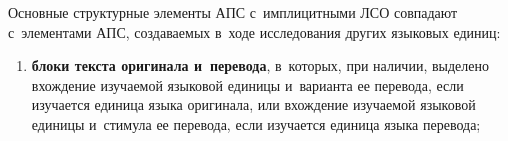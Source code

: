 \begin{multicols}{2}
Основные структурные элементы АПС с~имплицитными ЛСО совпадают с~элементами АПС, создаваемых в~ходе исследования других языковых 
единиц:
\begin{enumerate}[(1)]
\item \textbf{блоки текста оригинала и~перевода}, в~которых, при наличии, выделено вхождение 
изучаемой языковой единицы и~варианта ее перевода, если изучается единица языка оригинала, 
или вхождение изучаемой языковой единицы и~стимула ее перевода, если изучается единица 
языка перевода;

\end{enumerate}

\end{multicols}

\begin{figure*} %
\vspace*{1pt}
  \begin{center}
 \mbox{%
 \epsfxsize=96.774mm 
 }
\end{center}
\vspace*{-11pt}
\vspace*{6pt}
  \begin{center}
 \mbox{%
 \epsfxsize=103.489mm 
 }
\end{center}
\vspace*{-11pt}
\end{figure*}

